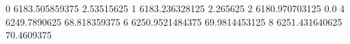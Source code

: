 0 6183.505859375 2.53515625
1 6183.236328125 2.265625
2 6180.970703125 0.0
4 6249.7890625 68.818359375
6 6250.9521484375 69.9814453125
8 6251.431640625 70.4609375
